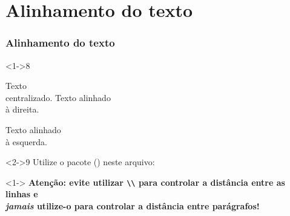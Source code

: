 \documentclass[handout,10pt]{beamer}
\begin{document}
\section{Alinhamento do texto}

\begin{frame}[fragile]
	\frametitle{Alinhamento do texto}
	
	\begin{atividade}<1->{8}
		\begin{LaTeXcode}
			\centering Texto\\centralizado.
			\raggedleft Texto alinhado\\à direita.
			\raggedright Texto alinhado\\à esquerda.
		\end{LaTeXcode}
	\end{atividade}\vfill
				
	\begin{atividade}<2->{9}
		Utilize o pacote  () neste arquivo:
		\begin{LaTeXcode}		
			\begin{center}\lipsum[1]\end{center}
			\begin{flushright}\lipsum[2]\end{flushright}		
			\begin{flushleft}\lipsum[3]\end{flushleft}
		\end{LaTeXcode}
	\end{atividade}\vfill		
				
	\centering
	\begin{uncoverenv}<1->
		\footnotesize\bfseries
		Atenção: evite utilizar \verb|\\| para controlar a distância entre as linhas e
		\\\emph{jamais} utilize-o para controlar a distância entre parágrafos!
	\end{uncoverenv}
			
\end{frame}
{
}
\end{document}
